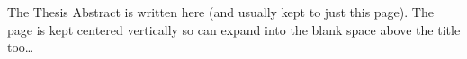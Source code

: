 The Thesis Abstract is written here (and usually kept to just this page). The page is kept centered vertically so can expand into the blank space above the title too\ldots

